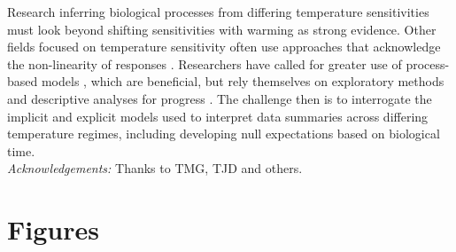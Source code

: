 \documentclass[11pt,letter]{article}
\begin{document}
Research inferring biological processes from differing temperature sensitivities must look beyond shifting sensitivities with warming as strong evidence. Other fields focused on temperature sensitivity often use approaches that acknowledge the non-linearity of responses \citep[e.g.,][]{yuste2004}. Researchers have called for greater use of process-based models \citep{keenan2019}, which are beneficial, but rely themselves on exploratory methods and descriptive analyses for progress \citep{chuine2016}. The challenge then is to interrogate the implicit and explicit models used to interpret data summaries across differing temperature regimes, including developing null expectations based on biological time. \\

\emph{Acknowledgements:} Thanks to TMG, TJD and others. 





\newpage
\section* {Figures}
\end{document}
